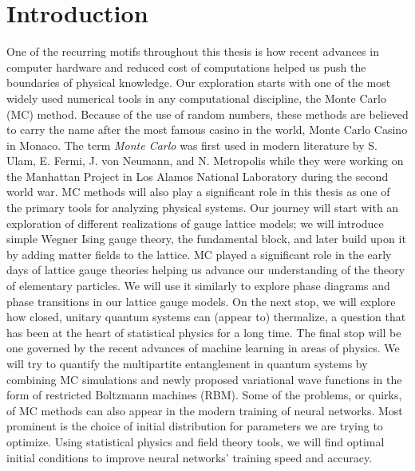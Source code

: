\chapter{Introduction}
\label{ch:Intro}
\par
One of the recurring motifs throughout this thesis is how recent advances in computer
hardware and reduced cost of computations helped us push the boundaries of physical
knowledge. Our exploration starts with one of the most widely used numerical tools in any computational discipline, the Monte Carlo (MC) method. Because of the use
of random numbers, these methods are believed to carry the name after the most
famous casino in the world, Monte Carlo Casino in Monaco. The term \textit{Monte Carlo} was
first used in modern literature by S. Ulam, E. Fermi, J. von Neumann, and N.
Metropolis while they were working on the Manhattan Project in Los Alamos National
Laboratory during the second world war. MC methods will also play a significant role in this
thesis as one of the primary tools for analyzing physical systems. Our
journey will start with an exploration of different realizations of gauge lattice models;
we will introduce simple Wegner Ising gauge theory, the fundamental block, and later
build upon it by adding matter fields to the lattice. MC played a significant role in
the early days of lattice gauge theories helping us advance our understanding of the theory of
elementary particles. We will use it similarly to explore phase diagrams and
phase transitions in our lattice gauge models. On the next stop, we will explore how closed, unitary quantum systems can (appear to) thermalize, a question
that has been at the heart of statistical physics for a long time. The final stop will
be one governed by the recent advances of machine learning in areas of physics.
We will try to quantify the multipartite entanglement in quantum systems by combining MC simulations and newly proposed variational wave functions in the form
of restricted Boltzmann machines (RBM). Some of the problems, or quirks, of MC methods
can also appear in the modern training of neural networks. Most prominent is
the choice of initial distribution for parameters we are trying to optimize. Using statistical physics and field theory tools, we will find optimal initial conditions to improve neural networks' training speed and accuracy.
\newpage     
